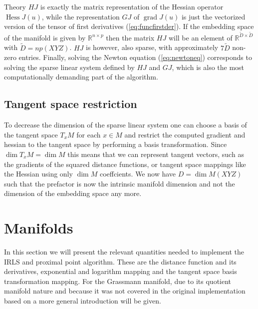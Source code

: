 \begin{chapter}{Theory}
$HJ$ is exactly the matrix representation of the Hessian operator $\operatorname{Hess}J(u)$, while the representation $GJ$ of $\operatorname{grad}J(u)$ is just the vectorized version
of the tensor of first derivatives (\ref{eq:funcfirstder}). If the embedding space of the manifold is given by $\mathbb{R}^{n\times p}$ then the matrix $HJ$
will be an element of $\mathbb{R}^{\tilde D\times\tilde D}$ with $\tilde D=np(XYZ)$. $HJ$ is however, also sparse, with approximately $7\tilde D$ non-zero entries.
Finally, solving the Newton equation (\ref{eq:newtoneq}) corresponds to solving the sparse linear system defined by $HJ$ and $GJ$, which is also the most computationally demanding
part of the algorithm.

\subsection{Tangent space restriction} %
\label{sub:Tangent space restriction}
To decrease the dimension of the sparse linear system one can choose a basis of the tangent space $T_xM$ for each $x\in M$ and restrict the computed gradient and hessian
to the tangent space by performing a basis transformation. Since $\operatorname{dim}T_xM=\operatorname{dim} M$ this means that we can represent tangent vectors, such as the gradients 
of the squared distance functions, or tangent space mappings like the Hessian using only $\operatorname{dim} M$ coeffcients. We now have $D=\operatorname{dim}M (XYZ)$ such that the 
prefactor is now the intrinsic manifold dimension and not the dimension of the embedding space any more.



\section{Manifolds} %
\label{sec:Manifolds}
In this section we will present the relevant quantities needed to implement the IRLS and proximal point algorithm. These are the distance function and its derivatives,
exponential and logarithm mapping and the tangent space basis transformation mapping. 
For the Grassmann manifold, due to its quotient manifold nature and because it was not covered in the original implementation based on \cite{SprecherIRLS}
a more general introduction will be given.


\end{chapter}

